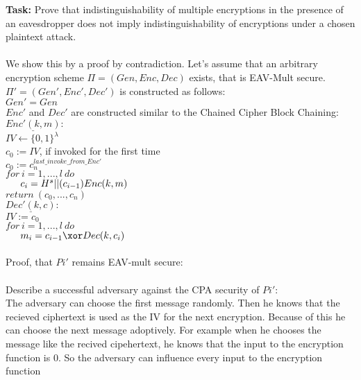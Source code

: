 \textbf{Task:} Prove that indistinguishability of multiple encryptions in the presence of an eavesdropper does
not imply indistinguishability of encryptions under a chosen plaintext attack.\\
\\
We show this by a proof by contradiction. Let's assume that an arbitrary encryption scheme \(\Pi = (Gen, Enc, Dec)\) exists, that is EAV-Mult secure.\\
\(\Pi' = (Gen', Enc', Dec')\) is constructed as follows:\\
\(Gen' = Gen\)\\
\(Enc'\) and \(Dec'\) are constructed similar to the Chained Cipher Block Chaining: \\
\(\underline{Enc'(k, m)}:\)\\
\(IV \leftarrow \{0,1\}^{\lambda}\)\\
\(c_0 := IV\), if invoked for the first time\\
\(c_0 := c_n^{last\_invoke\_from\_Enc'}\)\\
\(for\ i = 1, ..., l\ do \)\\
\(\indent c_i = H^s \vert \vert(c_{i-1})Enc(k, m)\)\\
\(return\ (c_0, ..., c_n)\)\\


\(\underline{Dec'(k, c)}:\)\\
\(IV := c_0\)\\
\(for\ i = 1, ..., l\ do \)\\
\(\indent m_i = c_{i-1} \xor Dec(k, c_{i})\)\\
\\
Proof, that \(Pi'\) remains EAV-mult secure:\\
\\
Describe a successful adversary against the CPA security of \(Pi'\):\\
The adversary can choose the first message randomly. Then he knows that the recieved ciphertext is used as the IV for the next encryption. Because of this he can choose the next message adoptively. For example when he chooses the message like the recived cipehertext, he knows that the input to the encryption function is 0. So the adversary can influence every input to the encryption function 